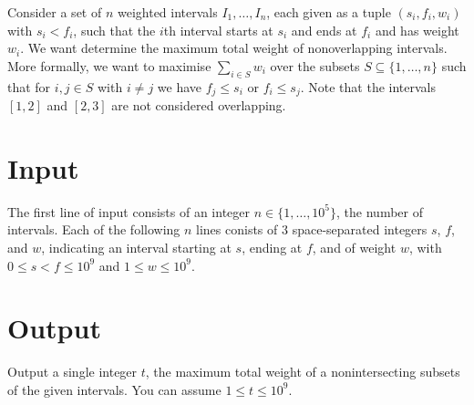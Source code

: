 
Consider a set of $n$ weighted intervals $I_1,\ldots, I_n$, each given as a tuple $(s_i, f_i, w_i)$ with $s_i<f_i$, such that the $i$th interval starts at $s_i$ and ends at $f_i$ and has weight $w_i$.
We want determine the maximum total weight of nonoverlapping intervals.
More formally, we want to maximise $\sum_{i\in S} w_i$ over the subsets $S\subseteq \{1,\ldots,n\}$ such that for $i, j\in S$ with $i\neq j$ we have $f_j \leq s_i$ or $f_i\leq s_j$. 
Note that the intervals $[1,2]$ and $[2,3]$ are not considered overlapping.

\section*{Input}

The first line of input consists of an integer $n\in\{1,\ldots, 10^5\}$, the number of intervals.
Each of the following $n$ lines conists of 3 space-separated integers $s$, $f$, and $w$, indicating an interval starting at $s$, ending at $f$, and of weight $w$, with $0\leq s<f\leq 10^9$ and $1\leq w\leq 10^9$.


\section*{Output}

Output a single integer $t$, the maximum total weight of a nonintersecting subsets of the given intervals.
You can assume  $1\leq t\leq 10^9$.
